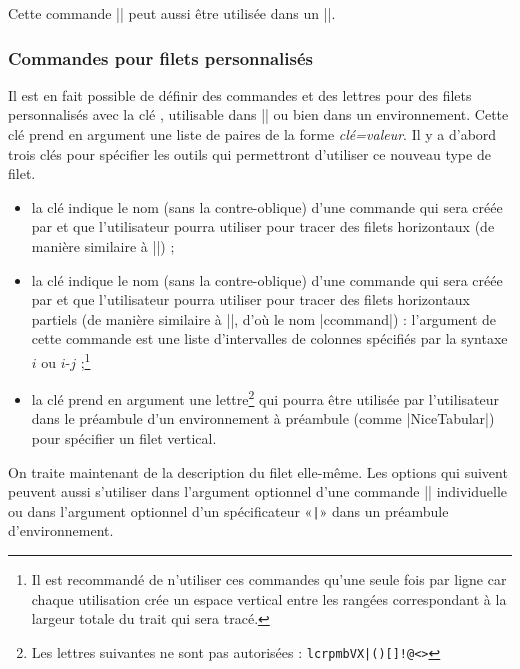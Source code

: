 \documentclass[dvipsnames]{article}%
\begin{document}
\medskip
Cette commande |\diagbox| peut aussi être utilisée dans un |\Block|.



\subsubsection{Commandes pour filets personnalisés}
\label{custom-line}


Il est en fait possible de définir des commandes et des lettres pour des filets
personnalisés avec la clé , utilisable dans
|\NiceMatrixOptions| ou bien dans un environnement. Cette clé prend en argument
une liste de paires de la forme \textsl{clé=valeur}. Il y a d'abord trois clés
pour spécifier les outils qui permettront d'utiliser ce nouveau type de filet.

\begin{itemize}
\item la clé  indique le nom (sans la contre-oblique) d'une commande
qui sera créée par  et que l'utilisateur pourra utiliser pour
tracer des filets horizontaux (de manière similaire à |\hline|) ; 

\item la clé  indique le nom (sans la contre-oblique) d'une
commande qui sera créée par  et que l'utilisateur pourra
utiliser pour tracer des filets horizontaux partiels (de manière similaire à
|\cline|, d'où le nom |ccommand|) : l'argument de cette commande est une liste
d'intervalles de colonnes spécifiés par la syntaxe $i$ ou $i$-$j$ ;\footnote{Il
  est recommandé de n'utiliser ces commandes qu'une seule fois par ligne car
  chaque utilisation crée un espace vertical entre les rangées correspondant à
  la largeur totale du trait qui sera tracé.}

\item la clé  prend en argument une lettre\footnote{Les lettres
  suivantes ne sont pas autorisées : \verb+lcrpmbVX|()[]!@<>+} qui pourra être
utilisée par l'utilisateur dans le préambule d'un environnement à préambule
(comme |{NiceTabular}|) pour spécifier un filet vertical.
\end{itemize}

\bigskip
On traite maintenant de la description du filet elle-même. Les options qui
suivent peuvent aussi s'utiliser dans l'argument optionnel d'une commande
|\Hline| individuelle ou dans l'argument optionnel d'un spécificateur «\verb+|+»
dans un préambule d'environnement.
\end{document}
